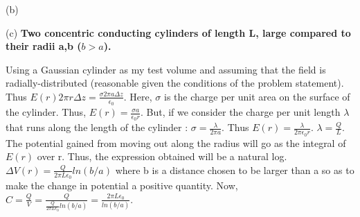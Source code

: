 \begin{homeworkProblem}
\begin{homeworkSection}{(b)}
\end{homeworkSection}

\begin{homeworkSection}{(c)}
\textbf{Two concentric conducting cylinders of length L, large compared to their radii a,b ($b > a$). }
\\ \par
Using a Gaussian cylinder as my test volume and assuming that the field is radially-distributed (reasonable given the conditions of the problem statement). Thus $E(r) 2 \pi r \Delta z = \frac{\sigma 2 \pi a \Delta z}{\epsilon_0}$. Here, $\sigma$ is the charge per unit area on the surface of the cylinder. Thus, $E(r) = \frac{\sigma a}{\epsilon_0 r}$. But, if we consider the charge per unit length $\lambda$ that runs along the length of the cylinder : $\sigma = \frac{\lambda}{2 \pi a}$. Thus $E(r) = \frac{\lambda}{2\pi \epsilon_0 r}$. $\lambda = \frac{Q}{L}$. The potential gained from moving out along the radius will go as the integral of $E(r)$ over r. Thus, the expression obtained will be a natural log. $\Delta V(r) = \frac{Q}{2\pi L \epsilon_0} ln(b/a)$ where b is a distance chosen to be larger than a so as to make the change in potential a positive quantity. Now, $C = \frac{Q}{V} = \frac{Q}{\frac{Q}{2\pi L \epsilon_0} ln(b/a)} = \frac{2 \pi L \epsilon_0}{ln(b/a)}$. 

\end{homeworkSection}


\end{homeworkProblem}